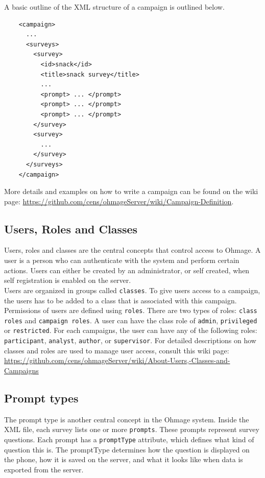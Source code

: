 \documentclass{scrartcl}
\begin{document}
\noindent A basic outline of the XML structure of a campaign is outlined below.

\begin{verbatim}
    <campaign>
      ... 
      <surveys>
        <survey>
          <id>snack</id>
          <title>snack survey</title>
          ...
          <prompt> ... </prompt>
          <prompt> ... </prompt>
          <prompt> ... </prompt>
        </survey>
        <survey>
          ...
        </survey>
      </surveys>
    </campaign>
\end{verbatim}

\noindent More details and examples on how to write a campaign can be found on
the wiki page:
\url{https://github.com/cens/ohmageServer/wiki/Campaign-Definition}.

\subsection{Users, Roles and Classes}
Users, roles and classes are the central concepts that control access to Ohmage.
A user is a person who can authenticate with the system and perform certain
actions. Users can either be created by an administrator, or self created,
when self registration is enabled on the server.\\

Users are organized in groups called \texttt{classes}. To give users access to a
campaign, the users has to be added to a class that is associated with this
campaign.\\

Permissions of users are defined using \texttt{roles}. There are two types of
roles: \texttt{class roles} and \texttt{campaign roles}. A user can have the
class role of \texttt{admin}, \texttt{privileged} or \texttt{restricted}. 
For each campaigns, the user can have any of the following roles:
\texttt{participant}, \texttt{analyst}, \texttt{author}, or \texttt{supervisor}.
For detailed descriptions on how classes and roles are used to manage user
access, consult this wiki page:\\

\url{https://github.com/cens/ohmageServer/wiki/About-Users,-Classes-and-Campaigns}



\subsection{Prompt types}

The prompt type is another central concept in the Ohmage system. Inside the XML
file, each survey lists one or more \texttt{prompts}. These prompts represent
survey questions. Each prompt has a \texttt{promptType} attribute, which defines
what kind of question this is. The promptType determines how the question is
displayed on the phone, how it is saved on the server, and what it looks like
when data is exported from the server. \\
\end{document}
